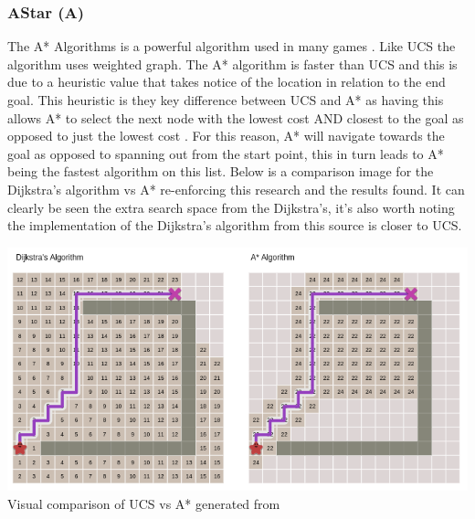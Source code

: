 \subsubsection{AStar (A\*)}
The A* Algorithms is a powerful algorithm used in many games \cite{cai_2015_a}. Like UCS the algorithm uses weighted graph. The A* algorithm is faster than UCS and this is due to a heuristic value that takes notice of the location in relation to the end goal. This heuristic is they key difference between UCS and A* as having this allows A* to select the next node with the lowest cost AND closest to the goal as opposed to just the lowest cost \cite{cai_2015_a}. For this reason, A* will navigate towards the goal as opposed to spanning out from the start point, this in turn leads to A* being the fastest algorithm on this list. Below is a comparison image for the Dijkstra's algorithm vs A* re-enforcing this research and the results found. It can clearly be seen the extra search space from the Dijkstra's, it's also worth noting the implementation of the Dijkstra's algorithm from this source is closer to UCS. 
\begin{center}
	\includegraphics[width=\linewidth]{images/research/Dijkstrasvastar.png}\\
	Visual comparison of UCS vs A* generated from \cite{redblobgames_2014_red}
\end{center}

